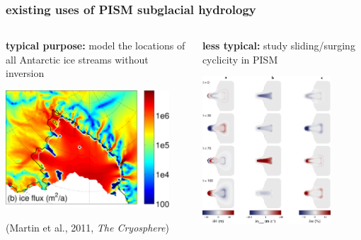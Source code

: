 \documentclass[hide notes,intlimits]{beamer}
\begin{document}
\begin{frame}
  \frametitle{existing uses of PISM subglacial hydrology}

\begin{columns}
\begin{column}{0.5\textwidth}
\begin{center}
\textbf{typical purpose:} model the locations of all Antarctic ice streams without inversion

\vspace{11mm}

\includegraphics[width=0.9\textwidth]{figs/martin-fig12}

\vspace{5mm}

\medskip
\scriptsize (Martin et al., 2011, \emph{The Cryosphere})
\end{center}
\end{column}
\begin{column}{0.5\textwidth}
\begin{center}
\textbf{less typical:} study sliding/surging cyclicity in PISM

\bigskip
\includegraphics[width=0.8\textwidth]{figs/vanPeltOerlemans-fig4}


\end{center}
\end{column}
\end{columns}
\end{frame}
\end{document}
